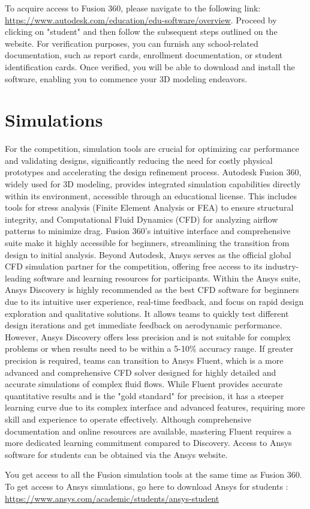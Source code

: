 To acquire access to Fusion 360, please navigate to the following link: \href{https://www.autodesk.com/education/edu-software/overview}{https://www.autodesk.com/education/edu-software/overview}. Proceed by clicking on "student" and then follow the subsequent steps outlined on the website. For verification purposes, you can furnish any school-related documentation, such as report cards, enrollment documentation, or student identification cards. Once verified, you will be able to download and install the software, enabling you to commence your 3D modeling endeavors.

\section{Simulations}

For the competition, simulation tools are crucial for optimizing car performance and validating designs, significantly reducing the need for costly physical prototypes and accelerating the design refinement process. Autodesk Fusion 360, widely used for 3D modeling, provides integrated simulation capabilities directly within its environment, accessible through an educational license. This includes tools for stress analysis (Finite Element Analysis or FEA) to ensure structural integrity, and Computational Fluid Dynamics (CFD) for analyzing airflow patterns to minimize drag. Fusion 360's intuitive interface and comprehensive suite make it highly accessible for beginners, streamlining the transition from design to initial analysis. Beyond Autodesk, Ansys serves as the official global CFD simulation partner for the competition, offering free access to its industry-leading software and learning resources for participants. Within the Ansys suite, Ansys Discovery is highly recommended as the best CFD software for beginners due to its intuitive user experience, real-time feedback, and focus on rapid design exploration and qualitative solutions. It allows teams to quickly test different design iterations and get immediate feedback on aerodynamic performance. However, Ansys Discovery offers less precision and is not suitable for complex problems or when results need to be within a 5-10\% accuracy range. If greater precision is required, teams can transition to Ansys Fluent, which is a more advanced and comprehensive CFD solver designed for highly detailed and accurate simulations of complex fluid flows. While Fluent provides accurate quantitative results and is the "gold standard" for precision, it has a steeper learning curve due to its complex interface and advanced features, requiring more skill and experience to operate effectively. Although comprehensive documentation and online resources are available, mastering Fluent requires a more dedicated learning commitment compared to Discovery. Access to Ansys software for students can be obtained via the Ansys website. \par

You get access to all the Fusion simulation tools at the same time as Fusion 360. To get access to Ansys simulations, go here to download Ansys for students : \href{https://www.ansys.com/academic/students/ansys-student}{https://www.ansys.com/academic/students/ansys-student}
